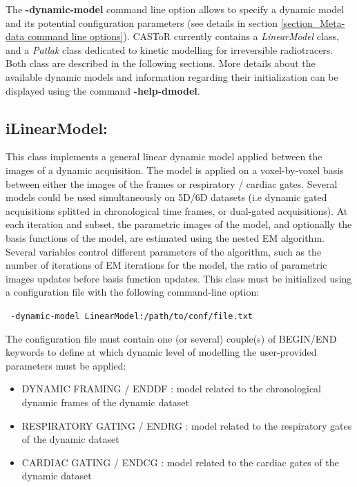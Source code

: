 \documentclass[a4paper, 11pt]{article}
\begin{document}
The \textbf{-dynamic-model} command line option allows to specify a dynamic model and its potential configuration parameters (see details in section \ref{section_Meta-data command line options}). CASToR currently contains a \textit{LinearModel} class, and a \textit{Patlak} class dedicated to kinetic modelling for irreversible radiotracers. Both class are described in the following sections. More details about the available dynamic models and information regarding their initialization can be displayed using the command \textbf{-help-dmodel}. 




\subsection{iLinearModel:}
\label{ss_lmodel}


This class implements a general linear dynamic model applied between the images of a dynamic acquisition. The model is applied on a voxel-by-voxel basis between either the images of the frames or respiratory / cardiac gates. Several models could be used simultaneously on 5D/6D datasets (i.e dynamic gated acquisitions splitted in chronological time frames, or dual-gated acquisitions). At each iteration and subset, the parametric images of the model, and optionally the basis functions of the model, are estimated using the nested EM algorithm. Several variables control different parameters of the algorithm, such as the number of iterations of EM iterations for the model, the ratio of parametric images updates before basis function updates. This class must be initialized using a configuration file with the following command-line option: 

\bigskip
\verb| -dynamic-model LinearModel:/path/to/conf/file.txt|
\bigskip

The configuration file must contain one (or several) couple(s) of BEGIN/END keywords to define at which dynamic level of modelling the user-provided parameters must be applied:
\begin{itemize}
\item DYNAMIC FRAMING / ENDDF : model related to the chronological dynamic frames of the dynamic dataset
\item RESPIRATORY GATING / ENDRG : model related to the respiratory gates of the dynamic dataset
\item CARDIAC GATING / ENDCG : model related to the cardiac gates of the dynamic dataset
\end{itemize}
\end{document}

